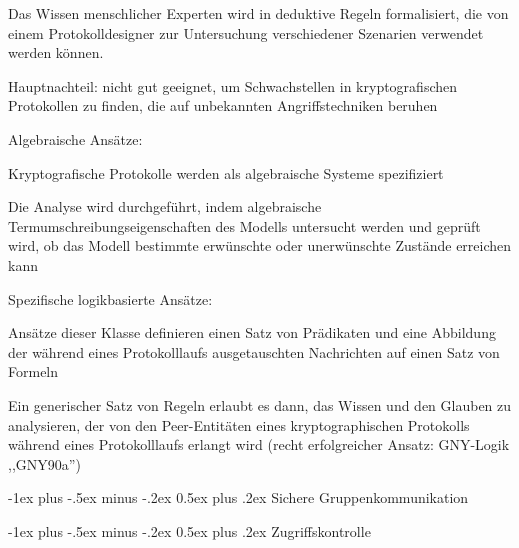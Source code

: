 \documentclass[a4paper]{article}
\makeatletter
\renewcommand{\section}{\@startsection{section}{1}{0mm}%
 {-1ex plus -.5ex minus -.2ex}%
 {0.5ex plus .2ex}%
 {\normalfont\large\bfseries}}
\makeatother
\begin{document}
\begin{multicols}{3}
\begin{itemize*}
\begin{itemize*}
                  \begin{itemize*}
                        \item Das Wissen menschlicher Experten wird in deduktive Regeln formalisiert, die von einem Protokolldesigner zur Untersuchung verschiedener Szenarien verwendet werden können.
                        \item Hauptnachteil: nicht gut geeignet, um Schwachstellen in kryptografischen Protokollen zu finden, die auf unbekannten Angriffstechniken beruhen
                  \end{itemize*}
                  \item Algebraische Ansätze:
                  \begin{itemize*}
                        \item Kryptografische Protokolle werden als algebraische Systeme spezifiziert
                        \item Die Analyse wird durchgeführt, indem algebraische Termumschreibungseigenschaften des Modells untersucht werden und geprüft wird, ob das Modell bestimmte erwünschte oder unerwünschte Zustände erreichen kann
                  \end{itemize*}
                  \item Spezifische logikbasierte Ansätze:
                  \begin{itemize*}
                        \item Ansätze dieser Klasse definieren einen Satz von Prädikaten und eine Abbildung der während eines Protokolllaufs ausgetauschten Nachrichten auf einen Satz von Formeln
                        \item Ein generischer Satz von Regeln erlaubt es dann, das Wissen und den Glauben zu analysieren, der von den Peer-Entitäten eines kryptographischen Protokolls während eines Protokolllaufs erlangt wird (recht erfolgreicher Ansatz: GNY-Logik ,,GNY90a'')
                  \end{itemize*}
            \end{itemize*}
      \end{itemize*}

      \section{Sichere Gruppenkommunikation}

      \section{Zugriffskontrolle}


\end{multicols}
\end{document}

